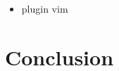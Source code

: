 \documentclass [a4paper] {report}
\theoremstyle {definition}
\begin{document}
\begin {itemize}
	\item plugin vim	
\end {itemize}


\chapter {Conclusion}


\printbibliography
\end{document}
